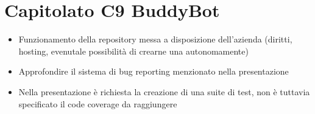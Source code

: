 \documentclass[10pt]{article}
\begin{document}
    \section{\textbf{Capitolato C9 BuddyBot}}
    \begin{itemize}
        \item Funzionamento della repository messa a disposizione dell'azienda (diritti, hosting, evenutale possibilità di crearne una autonomamente)
        \item Approfondire il sistema di bug reporting menzionato nella presentazione
        \item Nella presentazione è richiesta la creazione di una suite di test, non è tuttavia specificato il code coverage da raggiungere
    \end{itemize}
\end{document}
